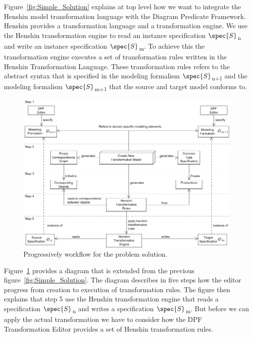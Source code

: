 Figure~\ref{fig:Simple_Solution} explains at top level how we want to integrate
the Henshin model transformation language with the Diagram Predicate Framework. Henshin
provides a transformation language and a transformation engine. We
use the Henshin transformation engine to read an instance specification
$\spec{S}$\textsubscript{n} and write an instance specification
$\spec{S}$\textsubscript{m}. To achieve this the transformation engine executes
a set of transformation rules written in the Henshin Transformation Language.
These transformation rules refers to the abstract syntax that is specified in
the modeling formalism $\spec{S}$\textsubscript{n+1} and the modeling formalism
$\spec{S}$\textsubscript{m+1} that the source and target model conforms to. 


\begin{figure}[H]
	\centering
	\includegraphics[scale=0.65]{./Figures/flowchart_v2.png}
	\caption[Work flow for the solution]
	{Progressively workflow for the problem solution.}
	\label{fig:work_flow_solution}
\end{figure}

Figure~\ref{fig:work_flow_solution} provides a diagram that is extended from the
previous figure~\ref{fig:Simple_Solution}. The diagram describes in five steps
how the editor progress from creation to execution of transformation rules. The
figure then explains that step 5 use the Henshin transformation engine that reads a
specification $\spec{S}$\textsubscript{n} and writes a specification
$\spec{S}$\textsubscript{m}. But before we can apply the actual transformation
we have to consider how the DPF Transformation Editor provides a set of Henshin
transformation rules.

